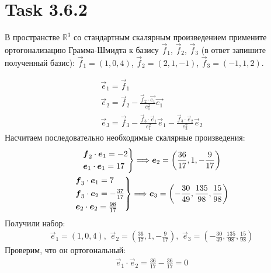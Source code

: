 \section{Task 3.6.2}
\begin{task}
    В пространстве $\mathbb{R}^3$ со стандартным скалярным произведением примените ортогонализацию Грамма-Шмидта к базису $\vec{f}_1$, $\vec{f}_2$, $\vec{f}_3$ (в ответ запишите полученный базис): $\vec{f}_1 = (1, 0, 4)$, $\vec{f}_2 = (2, 1, −1)$, $\vec{f}_3 = (−1, 1, 2)$.

\end{task}

\begin{solution}
    \begin{gather}
        \vec{e}_1 = \vec{f}_1 \\
        \vec{e}_2 = \vec{f}_2 - \frac{\vec{f}_2\cdot\vec{e_1}}{e_1^2}\vec{e_1} \\
        \vec{e}_3 = \vec{f}_3 - \frac{\vec{f}_3\cdot\vec{e}_1}{e_1^2}\vec{e}_1 - \frac{\vec{f}_3\cdot\vec{e}_2}{e_2^2}\vec{e}_2
    \end{gather}
    Насчитаем последовательно необходимые скалярные произведения:
    \begin{gather}
        \begin{rcases}
            \vec{f}_2\cdot\vec{e}_1 = -2 \\
            \vec{e}_1\cdot\vec{e}_1 = 17
        \end{rcases} \Longrightarrow \vec{e}_2 = \left(\frac{36}{17}, 1, -\frac{9}{17}\right) \\
        \begin{rcases}
            \vec{f}_3\cdot\vec{e}_1 = 7 \\
            \vec{f}_3\cdot\vec{e}_2 = -\frac{37}{17} \\
            \vec{e}_2\cdot\vec{e}_2 = \frac{98}{17}
        \end{rcases} \Longrightarrow \vec{e}_3 = \left(-\frac{30}{49}, \frac{135}{98},\frac{15}{98}\right)
    \end{gather}
    Получили набор:
    \begin{gather}
        \vec{e}_1 = (1,0,4),\,\,\vec{e}_2=\left(\frac{36}{17}, 1, -\frac{9}{17}\right), \,\, \vec{e}_3 = \left(-\frac{30}{49}, \frac{135}{98},\frac{15}{98}\right)
    \end{gather}
    Проверим, что он ортогональный:
    \begin{gather}
        \vec{e}_1\cdot\vec{e}_2 = \frac{36}{17} - \frac{36}{17} = 0 \\

\end{gather}
\end{solution}
